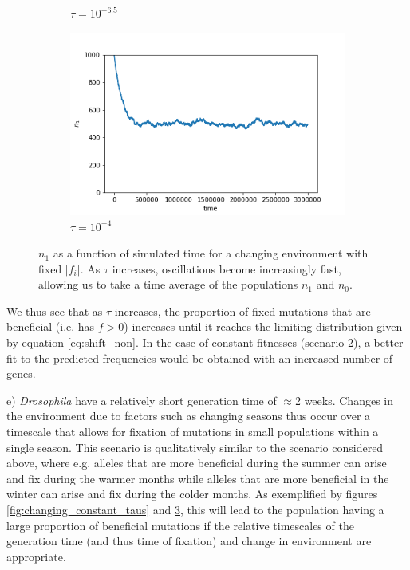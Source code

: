 \documentclass{article}
\begin{document}
\begin{figure}[h]
\begin{subfigure}[t]{0.305\linewidth}
		\caption{$\tau = 10^{-6.5}$}
		\label{fig:t65}
	\end{subfigure}
	\hspace{0.03\linewidth}
	\begin{subfigure}[t]{0.305\linewidth}
		\centering
		\includegraphics[width = 1.0\linewidth, trim={5 5 40 30}, clip=true]{figures/tau5e3_selection_trajec.png}
		\caption{$\tau = 10^{-4}$}
		\label{fig:t4}
	\end{subfigure}
\caption{$n_1$ as a function of simulated time for a changing environment with fixed $|f_i|$. As $\tau$ increases, oscillations become increasingly fast, allowing us to take a time average of the populations $n_1$ and $n_0$.}
\label{fig:changing_constant_trajecs}
\end{figure}

We thus see that as $\tau$ increases, the proportion of fixed mutations that are beneficial (i.e. has $f > 0$) increases until it reaches the limiting distribution given by equation \ref{eq:shift_non}.  In the case of constant fitnesses (scenario 2), a better fit to the predicted frequencies would be obtained with an increased number of genes.

\newpage

e)
\textit{Drosophila} have a relatively short generation time of $\approx$2 weeks. Changes in the environment due to factors such as changing seasons thus occur over a timescale that allows for fixation of mutations in small populations within a single season. This scenario is qualitatively similar to the scenario considered above, where e.g. alleles that are more beneficial during the summer can arise and fix during the warmer months while alleles that are more beneficial in the winter can arise and fix during the colder months. As exemplified by figures \ref{fig:changing_constant_taus} and \ref{fig:changing_constant_trajecs}, this will lead to the population having a large proportion of beneficial mutations if the relative timescales of the generation time (and thus time of fixation) and change in environment are appropriate.
\end{document}
